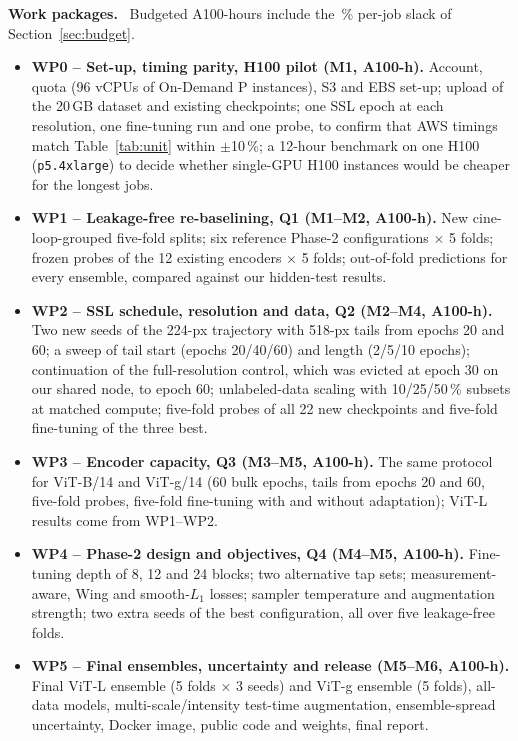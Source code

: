 \documentclass[11pt,a4paper]{article}
\newcommand{\para}[1]{\textbf{#1}\ }
\begin{document}
\para{Work packages.} Budgeted A100-hours include the \SlackPct\,\% per-job slack of Section~\ref{sec:budget}.
\begin{itemize}
\item \textbf{WP0 -- Set-up, timing parity, H100 pilot (M1, \GPUhWPZero{} A100-h).} Account, quota (96 vCPUs of On-Demand P instances), S3 and EBS set-up; upload of the 20\,GB dataset and existing checkpoints; one SSL epoch at each resolution, one fine-tuning run and one probe, to confirm that AWS timings match Table~\ref{tab:unit} within $\pm$10\,\%; a 12-hour benchmark on one H100 (\texttt{p5.4xlarge}) to decide whether single-GPU H100 instances would be cheaper for the longest jobs.
\item \textbf{WP1 -- Leakage-free re-baselining, Q1 (M1--M2, \GPUhWPOne{} A100-h).} New cine-loop-grouped five-fold splits; six reference Phase-2 configurations $\times$ 5 folds; frozen probes of the 12 existing encoders $\times$ 5 folds; out-of-fold predictions for every ensemble, compared against our hidden-test results.
\item \textbf{WP2 -- SSL schedule, resolution and data, Q2 (M2--M4, \GPUhWPTwo{} A100-h).} Two new seeds of the 224-px trajectory with 518-px tails from epochs 20 and 60; a sweep of tail start (epochs 20/40/60) and length (2/5/10 epochs); continuation of the full-resolution control, which was evicted at epoch 30 on our shared node, to epoch 60; unlabeled-data scaling with 10/25/50\,\% subsets at matched compute; five-fold probes of all 22 new checkpoints and five-fold fine-tuning of the three best.
\item \textbf{WP3 -- Encoder capacity, Q3 (M3--M5, \GPUhWPThree{} A100-h).} The same protocol for ViT-B/14 and ViT-g/14 (60 bulk epochs, tails from epochs 20 and 60, five-fold probes, five-fold fine-tuning with and without adaptation); ViT-L results come from WP1--WP2.
\item \textbf{WP4 -- Phase-2 design and objectives, Q4 (M4--M5, \GPUhWPFour{} A100-h).} Fine-tuning depth of 8, 12 and 24 blocks; two alternative tap sets; measurement-aware, Wing and smooth-$L_1$ losses; sampler temperature and augmentation strength; two extra seeds of the best configuration, all over five leakage-free folds.
\item \textbf{WP5 -- Final ensembles, uncertainty and release (M5--M6, \GPUhWPFive{} A100-h).} Final ViT-L ensemble (5 folds $\times$ 3 seeds) and ViT-g ensemble (5 folds), all-data models, multi-scale/intensity test-time augmentation, ensemble-spread uncertainty, Docker image, public code and weights, final report.
\end{itemize}
\end{document}
